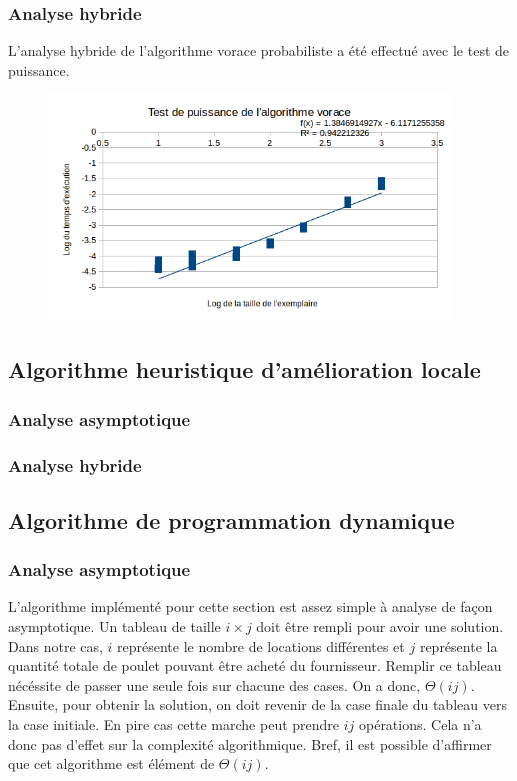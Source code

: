 \documentclass[a4paper, 12pt]{article} %
\begin{document}
\subsubsection*{Analyse hybride}
L'analyse hybride de l'algorithme vorace probabiliste a été effectué avec le test de puissance.
\begin{figure}[H]
    \centering
    \includegraphics[width=0.95\textwidth]{Figure/AlgorithmeVorace}
\end{figure}

\subsection*{Algorithme heuristique d'amélioration locale}
\subsubsection*{Analyse asymptotique}
\subsubsection*{Analyse hybride}

\subsection*{Algorithme de programmation dynamique}
\subsubsection*{Analyse asymptotique}
    L'algorithme implémenté pour cette section est assez simple à analyse de façon
    asymptotique. Un tableau de taille $i\times j$ doit être rempli pour avoir une solution.
    Dans notre cas, $i$ représente le nombre de locations différentes et $j$ représente la quantité
    totale de poulet pouvant être acheté du fournisseur. Remplir ce tableau nécéssite de passer une seule
    fois sur chacune des cases. On a donc, $\Theta(ij)$. Ensuite, pour obtenir la solution, on doit 
    revenir de la case finale du tableau vers la case initiale. En pire cas cette marche peut prendre
    $ij$ opérations. Cela n'a donc pas d'effet sur la complexité algorithmique. Bref, il est possible 
    d'affirmer que cet algorithme est élément de $\Theta(ij)$.
\end{document}
